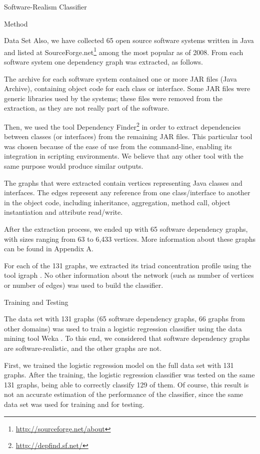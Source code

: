 \documentclass[11pt,twocolumn,a4paper,english]{article}
\begin{document}
\begin{section}{Software-Realism Classifier}
\begin{subsection}{Method}
\begin{subsubsection}{Data Set}
	Also, we have collected 65 open source software systems written in Java and listed at SourceForge.net\footnote{\url{http://sourceforge.net/about}} among the most popular as of 2008. From each software system one dependency graph was extracted, as follows.
	
	The archive for each software system contained one or more JAR files (Java Archive), containing object code for each class or interface. Some JAR files were generic libraries used by the systems; these files were removed from the extraction, as they are not really part of the software.
	
	Then, we used the tool Dependency Finder\footnote{\url{http://depfind.sf.net/}} in order to extract dependencies between classes (or interfaces) from the remaining JAR files. This particular tool was chosen because of the ease of use from the command-line, enabling its integration in scripting environments. We believe that any other tool with the same purpose would produce similar outputs.
	
	The graphs that were extracted contain vertices representing Java classes and interfaces. The edges represent any reference from one class/interface to another in the object code, including inheritance, aggregation, method call, object instantiation and attribute read/write.
	
	After the extraction process, we ended up with 65 software dependency graphs, with sizes ranging from 63 to 6,433 vertices. More information about these graphs can be found in Appendix A. %
	
	For each of the 131 graphs, we extracted its triad concentration profile using the tool igraph \cite{igraph}. No other information about the network (such as number of vertices or number of edges) was used to build the classifier.

\end{subsubsection}

\begin{subsubsection}{Training and Testing}
	
	The data set with 131 graphs (65 software dependency graphs, 66 graphs from other domains) was used to train a logistic regression classifier using the data mining tool Weka \cite{weka}. To this end, we considered that software dependency graphs are software-realistic, and the other graphs are not. 
		
	First, we trained the logistic regression model on the full data set with 131 graphs. After the training, the logistic regression classifier was tested on the same 131 graphs, being able to correctly classify 129 of them. Of course, this result is not an accurate estimation of the performance of the classifier, since the same data set was used for training and for testing.
	

\end{subsubsection}
\end{subsection}
\end{section}
\end{document}
